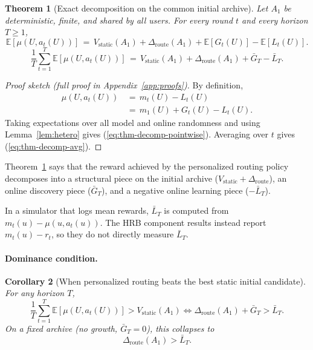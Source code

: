 \documentclass{article} %
\newtheorem{theorem}{Theorem}
\newtheorem{corollary}[theorem]{Corollary}
\providecommand{\E}{\mathbb{E}}
\renewcommand{\eqref}[1]{\textup{(\ref{#1})}}
\begin{document}
\label{sec:method-thm-decomp}

\begin{theorem}[Exact decomposition on the common initial archive]
\label{thm:decomp}
Let $A_1$ be deterministic, finite, and shared by all users. For every round $t$ and every horizon $T \ge 1$,
\begin{equation}
\label{eq:thm-decomp-pointwise}
\E[\mu(U, a_t(U))]
\,=\, V_{\mathrm{static}}(A_1) + \Delta_{\mathrm{route}}(A_1) + \E[G_t(U)] - \E[L_t(U)].
\end{equation}
\begin{equation}
\label{eq:thm-decomp-avg}
\frac{1}{T}\sum_{t=1}^T \E[\mu(U, a_t(U))]
\,=\, V_{\mathrm{static}}(A_1) + \Delta_{\mathrm{route}}(A_1) + \bar G_T - \bar L_T.
\end{equation}
\end{theorem}

\begin{proof}[Proof sketch (full proof in Appendix~\ref{app:proofs})]
By definition,
\begin{equation*}
\begin{aligned}
\mu(U,a_t(U))
&\,=\,m_t(U)-L_t(U)\\
&\,=\,m_1(U)+G_t(U)-L_t(U).
\end{aligned}
\end{equation*}
Taking expectations over all model and online randomness and using
Lemma~\ref{lem:hetero} gives \eqref{eq:thm-decomp-pointwise}. Averaging over
$t$ gives \eqref{eq:thm-decomp-avg}.
\end{proof}

Theorem~\ref{thm:decomp} says that the reward achieved by the personalized routing policy decomposes into a structural piece on the initial archive ($V_{\mathrm{static}}+\Delta_{\mathrm{route}}$), an online discovery piece ($\bar G_T$), and a negative online learning piece ($-\bar L_T$).

In a simulator that logs mean rewards, \(\bar L_T\) is computed from
\(m_t(u)-\mu(u,a_t(u))\). The HRB component results instead report
\(m_t(u)-r_t\), so they do not directly measure \(\bar L_T\).

\paragraph{Dominance condition.}

\label{sec:method-cor-dom}

\begin{corollary}[When personalized routing beats the best static initial candidate]
\label{cor:dominance}
For any horizon $T$,
\begin{equation}
\label{eq:cor-dom}
\frac{1}{T}\sum_{t=1}^T \E[\mu(U, a_t(U))] > V_{\mathrm{static}}(A_1)
\iff
\Delta_{\mathrm{route}}(A_1) + \bar G_T > \bar L_T.
\end{equation}
On a fixed archive (no growth, $\bar G_T = 0$), this collapses to
\begin{equation}
\label{eq:cor-dom-fixed}
\Delta_{\mathrm{route}}(A_1) > \bar L_T.
\end{equation}
\end{corollary}
\end{document}
